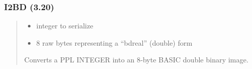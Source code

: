 \documentclass[letterpaper,10pt,english]{sphinxmanual}
\begin{document}
\subsubsection{I2BD (3.20)}
\label{\detokenize{ppl:id1}}\begin{quote}

\sphinxAtStartPar
{}
\begin{description}
\begin{itemize}
\item {} 
\sphinxAtStartPar
{} \textendash{} integer to serialize

\end{itemize}

\begin{itemize}
\item {} 
\sphinxAtStartPar
{} \textendash{} 8 raw bytes representing a “bdreal” (double) form

\end{itemize}

\sphinxAtStartPar
Converts a PPL INTEGER into an 8‑byte BASIC double binary image.

\end{description}

\sphinxAtStartPar
{}
\begin{quote}

\begin{sphinxVerbatim}[commandchars=\\\{\}]
  
 

    
  
 
 
 
\end{sphinxVerbatim}
\end{quote}
\end{quote}
\end{document}
